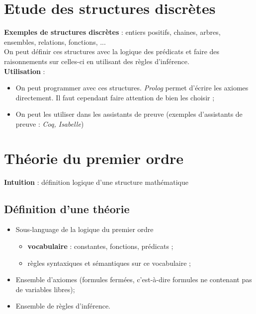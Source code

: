 \chapter*{Etude des structures discrètes}
\noindent
\textbf{Exemples de structures discrètes} : entiers positifs, chaines, arbres, ensembles, relations, fonctions, ...\\

On peut définir ces structures avec la logique des prédicats et faire des raisonnements sur celles-ci en utilisant des règles d'inférence.\\

\noindent
\textbf{Utilisation} :\begin{itemize}
\item On peut programmer avec ces structures. \textit{Prolog} permet d'écrire les axiomes directement. Il faut cependant faire attention de bien les choisir ;
\item On peut les utiliser dans les assistants de preuve (exemples d'assistants de preuve : \textit{Coq, Isabelle})\\
\end{itemize}

\chapter*{Théorie du premier ordre}
\noindent
\textbf{Intuition} : définition logique d'une structure mathématique

\noindent
\section*{Définition d'une théorie}
\begin{itemize}
\item Sous-language de la logique du premier ordre
\begin{itemize}
\item \textbf{vocabulaire} : constantes, fonctions, prédicats ;
\item règles syntaxiques et sémantiques sur ce vocabulaire ;
\end{itemize}
\item Ensemble d'axiomes (formules fermées, c'est-à-dire formules ne contenant pas de variables libres);
\item Ensemble de règles d'inférence.
\end{itemize}

